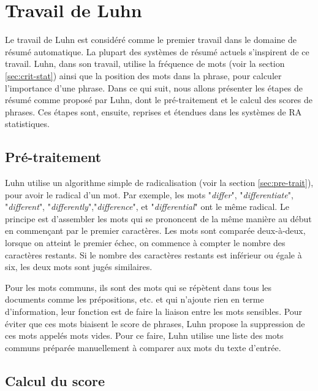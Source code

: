 \documentclass[a4paper,12pt,oneside]{../use/ESIthesis}
\begin{document}
\section{Travail de Luhn}

Le travail de Luhn \cite{58-luhn} est considéré comme le premier travail dans le domaine de résumé automatique. 
La plupart des systèmes de résumé actuels s'inspirent de ce travail. 
Luhn, dans son travail, utilise la fréquence de mots (voir la section \ref{sec:crit-stat}) ainsi que la position des mots dans la phrase, pour calculer l'importance d'une phrase. 
Dans ce qui suit, nous allons présenter les étapes de résumé comme proposé par Luhn, dont le pré-traitement et le calcul des scores de phrases.
Ces étapes sont, ensuite, reprises et étendues dans les systèmes de RA statistiques.

\subsection{Pré-traitement}


Luhn utilise un algorithme simple de radicalisation (voir la section \ref{sec:pre-trait}), pour avoir le radical d'un mot. 
Par exemple, les mots "\textit{differ}", "\textit{differentiate}", "\textit{different}", "\textit{differently}","\textit{difference}", et "\textit{differential}" ont le même radical. 
Le principe est d'assembler les mots qui se prononcent de la même manière au début en commençant par le premier caractères. 
Les mots sont comparée deux-à-deux, lorsque on atteint le premier échec, on commence à compter le nombre des caractères restants. 
Si le nombre des caractères restants est inférieur ou égale à six, les deux mots sont jugés similaires. 

Pour les mots communs, ils sont des mots qui se répètent dans tous les documents comme les prépositions, etc. et qui n'ajoute rien en terme d'information, leur fonction est de faire la liaison entre les mots sensibles. 
Pour éviter que ces mots biaisent le score de phrases, Luhn propose la suppression de ces mots appelés mots vides. 
Pour ce faire, Luhn utilise une liste des mots communs préparée manuellement à comparer aux mots du texte d'entrée. 

\subsection{Calcul du score}
\end{document}
